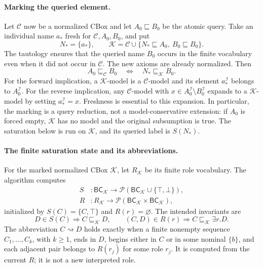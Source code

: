 \paragraph{Marking the queried element.}
\label{sec:p09-elpp-query-marking}
Let \(\mathcal C\) now be a normalized CBox and let
\(A_0\sqsubseteq B_0\) be the atomic query.  Take an individual name
\(a_\ast\) fresh for \(\mathcal C,A_0,B_0\), and put
\[
 N_\ast=\{a_\ast\},\qquad
 \mathcal K=\mathcal C\cup
       \{N_\ast\sqsubseteq A_0,\ B_0\sqsubseteq B_0\}.
\]
The tautology ensures that the queried name \(B_0\) occurs in the finite
vocabulary even when it did not occur in \(\mathcal C\).
The new axioms are already normalized.  Then
\[
 A_0\sqsubseteq_{\mathcal C}B_0
 \quad\Longleftrightarrow\quad
 N_\ast\sqsubseteq_{\mathcal K}B_0.
 \tag{Q}
\]
For the forward implication, a \(\mathcal K\)-model is a
\(\mathcal C\)-model and its element \(a_\ast^{\mathcal I}\) belongs to
\(A_0^{\mathcal I}\).  For the reverse implication, any
\(\mathcal C\)-model with
\(x\in A_0^{\mathcal I}\setminus B_0^{\mathcal I}\) expands to a
\(\mathcal K\)-model by setting \(a_\ast^{\mathcal I}=x\).
Freshness is essential to this expansion.  In particular, the marking is a
query reduction, not a model-conservative extension: if \(A_0\) is forced
empty, \(\mathcal K\) has no model and the original subsumption is true.
The saturation below is run on \(\mathcal K\), and its queried label is
\(S(N_\ast)\).

\paragraph{The finite saturation state and its abbreviations.}
For the marked normalized CBox \(\mathcal K\), let \(R_{\mathcal K}\) be its finite role
vocabulary.  The algorithm computes
\[
\begin{aligned}
 S&:\mathsf{BC}_{\mathcal K}\longrightarrow
   \mathcal P(\mathsf{BC}_{\mathcal K}\cup\{\top,\bot\}),\\
 R&:R_{\mathcal K}\longrightarrow
   \mathcal P(\mathsf{BC}_{\mathcal K}\times
              \mathsf{BC}_{\mathcal K}),
\end{aligned}
\]
initialized by \(S(C)=\{C,\top\}\) and \(R(r)=\varnothing\).  The intended
invariants are
\[
 D\in S(C)\Rightarrow C\sqsubseteq_{\mathcal K}D,
 \qquad
 (C,D)\in R(r)\Rightarrow C\sqsubseteq_{\mathcal K}\exists r.D.
\]
The abbreviation \(C\rightsquigarrow D\) holds exactly when a finite nonempty
sequence \(C_1,\ldots,C_k\), with \(k\geq1\), ends in \(D\), begins either in \(C\) or in some nominal
\(\{b\}\), and each adjacent pair belongs to \(R(r_j)\) for some role
\(r_j\).  It is computed from the current \(R\); it is not a new interpreted
role.

